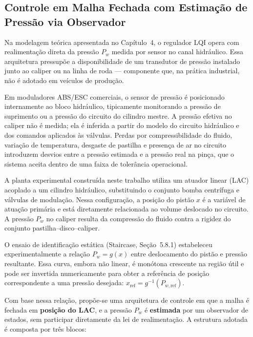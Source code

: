\subsection{Controle em Malha Fechada com Estimação de Pressão via Observador}

Na modelagem teórica apresentada no Capítulo~4, o regulador LQI opera com
realimentação direta da pressão $P_w$ medida por sensor no canal hidráulico.
Essa arquitetura pressupõe a disponibilidade de um transdutor de pressão
instalado junto ao caliper ou na linha de roda --- componente que, na prática
industrial, não é adotado em veículos de produção.

Em moduladores ABS/ESC comerciais, o sensor de pressão é posicionado
internamente ao bloco hidráulico, tipicamente monitorando a pressão de
suprimento ou a pressão do circuito do cilindro mestre. A pressão efetiva
no caliper não é medida; ela é inferida a partir do modelo do circuito
hidráulico e dos comandos aplicados às válvulas. Perdas por compressibilidade
do fluido, variação de temperatura, desgaste de pastilha e presença de ar no
circuito introduzem desvios entre a pressão estimada e a pressão real na
pinça, que o sistema aceita dentro de uma faixa de tolerância operacional.

A planta experimental construída neste trabalho utiliza um atuador linear
(LAC) acoplado a um cilindro hidráulico, substituindo o conjunto bomba
centrífuga e válvulas de modulação. Nessa configuração, a posição do pistão
$x$ é a variável de atuação primária e está diretamente relacionada ao volume
deslocado no circuito. A pressão $P_w$ no caliper resulta da compressão do
fluido contra a rigidez do conjunto pastilha--disco--caliper.

O ensaio de identificação estática (Staircase, Seção~5.8.1) estabeleceu
experimentalmente a relação $P_w = g(x)$ entre deslocamento do pistão e
pressão resultante. Essa curva, embora não linear, é monótona crescente na
região útil e pode ser invertida numericamente para obter a referência de
posição correspondente a uma pressão desejada: $x_{\text{ref}} = g^{-1}(P_{w,\text{ref}})$.

Com base nessa relação, propõe-se uma arquitetura de controle em que a malha
é fechada em \textbf{posição do LAC}, e a pressão $P_w$ é \textbf{estimada}
por um observador de estados, sem participar diretamente da lei de
realimentação. A estrutura adotada é composta por três blocos:

